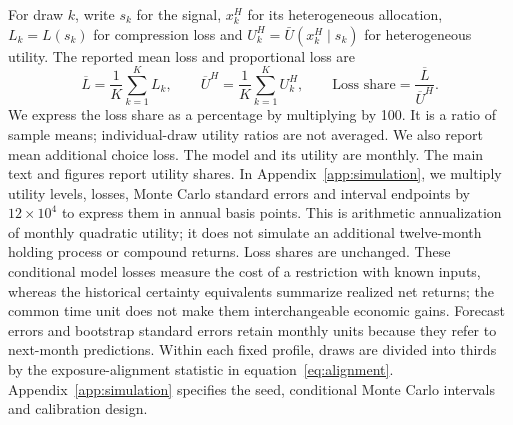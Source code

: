 For draw $k$, write $s_k$ for the signal, $x_k^H$ for its heterogeneous allocation, $L_k=L(s_k)$ for compression loss and $U_k^H=\bar U(x_k^H\mid s_k)$ for heterogeneous utility. The reported mean loss and proportional loss are
\begin{equation}
\overline L=\frac{1}{K}\sum_{k=1}^{K}L_k,
\qquad
\overline U^H=\frac{1}{K}\sum_{k=1}^{K}U_k^H,
\qquad
\text{Loss share}=\frac{\overline L}{\overline U^H}.
\label{eq:simulation-summary}
\end{equation}
We express the loss share as a percentage by multiplying by 100. It is a ratio of sample means; individual-draw utility ratios are not averaged. We also report mean additional choice loss. The model and its utility are monthly. The main text and figures report utility shares. In Appendix~\ref{app:simulation}, we multiply utility levels, losses, Monte Carlo standard errors and interval endpoints by $12\times10^4$ to express them in annual basis points. This is arithmetic annualization of monthly quadratic utility; it does not simulate an additional twelve-month holding process or compound returns. Loss shares are unchanged. These conditional model losses measure the cost of a restriction with known inputs, whereas the historical certainty equivalents summarize realized net returns; the common time unit does not make them interchangeable economic gains. Forecast errors and bootstrap standard errors retain monthly units because they refer to next-month predictions. Within each fixed profile, draws are divided into thirds by the exposure-alignment statistic in equation~\eqref{eq:alignment}. Appendix~\ref{app:simulation} specifies the seed, conditional Monte Carlo intervals and calibration design.

